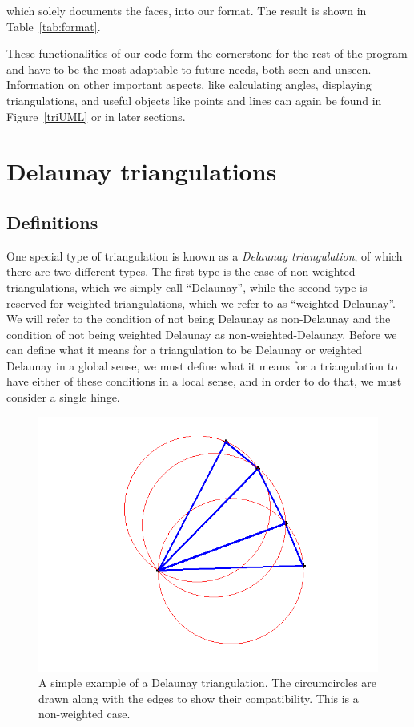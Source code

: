 \documentclass[12pt]{article}
\begin{document}
which solely documents the faces, into our format. The result is shown in Table~\ref{tab:format}. 

 These functionalities of our code form the cornerstone for the rest of the program and have to be the most adaptable to future needs, both seen and unseen. Information on other important aspects, like calculating angles, displaying triangulations, and useful objects like points and lines can again be found in Figure~\ref{triUML} or in later sections. 

\section{Delaunay triangulations}
\label{DT}

\subsection{Definitions}
\label{DTD}

 One special type of triangulation is known as a \textit{Delaunay triangulation}, of which there are two different types. The first type is the case of non-weighted triangulations, which we simply call ``Delaunay'', while the second type is reserved for weighted triangulations, which we refer to as ``weighted Delaunay''. We will refer to the condition of not being Delaunay as non-Delaunay and the condition of not being weighted Delaunay as non-weighted-Delaunay. Before we can define what it means for a triangulation to be Delaunay or weighted Delaunay in a global sense, we must define what it means for a triangulation to have either of these conditions in a local sense, and in order to do that, we must consider a single hinge.

\begin{figure}
\centering
\includegraphics[scale = 0.6]{Pictures3/genTri4.png}
\caption{A simple example of a Delaunay triangulation. The circumcircles are drawn along with the edges to show their compatibility. This is a non-weighted case.}
\label{genTri}
\end{figure}
\end{document}
